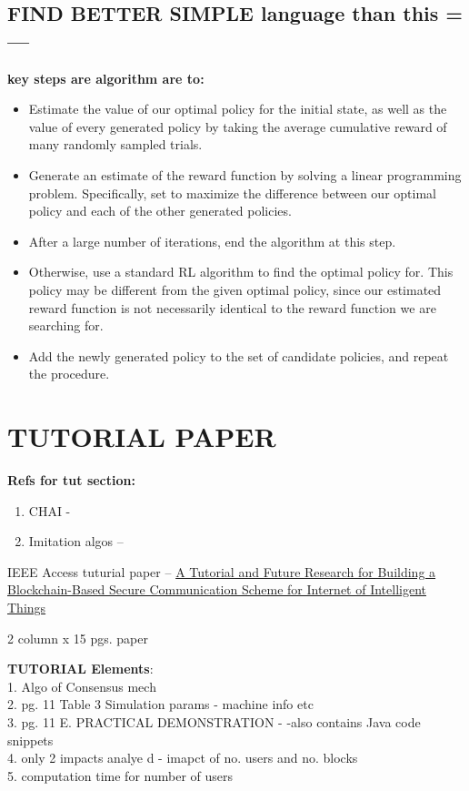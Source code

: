 \documentclass{article}
\begin{document}
\subsection{FIND BETTER SIMPLE language than this =--- }

\textbf{key steps are algorithm are to:}
\begin{itemize}
\item Estimate the value of our optimal policy for the initial state, as well as the value of every generated policy 	by taking the average cumulative reward of many randomly sampled trials.

\item Generate an estimate of the reward function by solving a linear programming problem. Specifically, set to maximize the difference between our optimal policy and each of the other generated policies.

\item After a large number of iterations, end the algorithm at this step.

\item Otherwise, use a standard RL algorithm to find the optimal policy for. This policy may be different from the given optimal policy, since our estimated reward function is not necessarily identical to the reward function we are searching for.

\item Add the newly generated policy to the set of candidate policies, and repeat the procedure.
\end{itemize}


\section{TUTORIAL PAPER}\label{sec:Tutorial}

\textbf{Refs for tut section:}
\begin{enumerate}
	\item CHAI - \cite{CHAI}
	\item Imitation algos -- \cite{imitation-algos}
\end{enumerate}
\par

IEEE Access tuturial paper -- \href{https://ieeexplore.ieee.org/document/9086464}{A Tutorial and Future Research for Building a Blockchain-Based Secure Communication Scheme for Internet of Intelligent Things} 

2 column x 15 pgs. paper

\textbf{TUTORIAL Elements}:\\
1. Algo of Consensus mech\\
2. pg. 11 Table 3 Simulation params - machine info etc\\
3. pg. 11 E. PRACTICAL DEMONSTRATION - -also contains Java code snippets\\
4. only 2 impacts analye d - imapct of no. users and no. blocks \\
5. computation time for number of users\\
\end{document}
